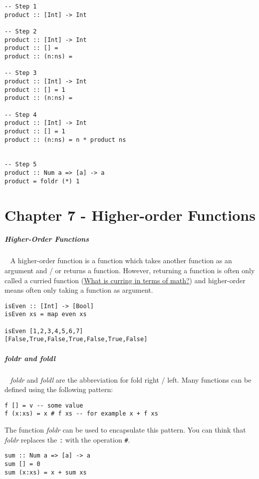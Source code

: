 \documentclass[11pt,twoside,landscape]{article}
\begin{document}
\begin{multicols}{3}
\lstset{language=haskell,label= ,caption= ,captionpos=b,numbers=none}
\begin{lstlisting}
-- Step 1
product :: [Int] -> Int

-- Step 2
product :: [Int] -> Int
product :: [] =
product :: (n:ns) =

-- Step 3
product :: [Int] -> Int
product :: [] = 1
product :: (n:ns) = 

-- Step 4
product :: [Int] -> Int
product :: [] = 1
product :: (n:ns) = n * product ns


-- Step 5
product :: Num a => [a] -> a
product = foldr (*) 1
\end{lstlisting}

\section{Chapter 7 - Higher-order Functions}
\label{sec:org1cd6e6b}
\subparagraph{Higher-Order Functions} \
\label{sec:org18fbc54}
A higher-order function is a function which takes another function as an argument and / or returns a function.
However, returning a function is often only called a curried function (\href{../../../roam/20220217093010-what_is_curring_in_terms_of_math.org}{What is curring in terms of math?}) and
higher-order means often only taking a function as argument.


\lstset{language=haskell,label= ,caption= ,captionpos=b,numbers=none}
\begin{lstlisting}
isEven :: [Int] -> [Bool]
isEven xs = map even xs

isEven [1,2,3,4,5,6,7]
[False,True,False,True,False,True,False]
\end{lstlisting}

\subparagraph{foldr and foldl} \
\label{sec:org73137a5}
\emph{foldr} and \emph{foldl} are the abbreviation for fold right / left.
Many functions can be defined using the following pattern:

\lstset{language=haskell,label= ,caption= ,captionpos=b,numbers=none}
\begin{lstlisting}
f [] = v -- some value
f (x:xs) = x # f xs -- for example x + f xs
\end{lstlisting}

The function \emph{foldr} can be used to encapsulate this pattern.
You can think that \emph{foldr} replaces the \texttt{:} with the operation \texttt{\#}.
\lstset{language=haskell,label= ,caption= ,captionpos=b,numbers=none}
\begin{lstlisting}
sum :: Num a => [a] -> a
sum [] = 0
sum (x:xs) = x + sum xs



\end{lstlisting}
\end{multicols}
\end{document}
